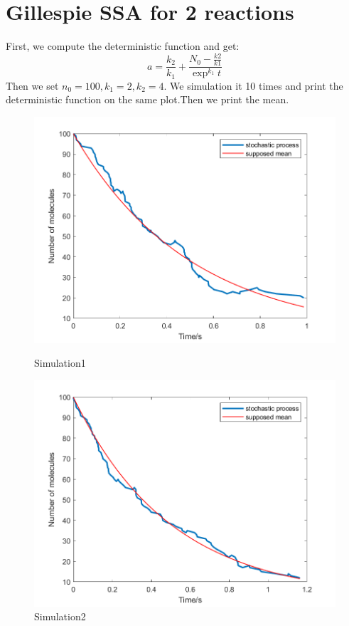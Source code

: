 \documentclass{article}
\begin{document}
\section{Gillespie SSA for 2 reactions}
First, we compute the deterministic function and get:
\begin{equation}
a=\frac{k_2}{k_1}+\frac{N_0-\frac{k2}{k1}}{\exp^{k_1}t}
\end{equation}
Then we set $n_0=100,k_1=2,k_2=4$. We simulation it 10 times and print the deterministic function on the same plot.Then we print the mean.
\begin{figure}[htbp]
    \centering
    \begin{minipage}{0.45\linewidth}
        \centering
        \includegraphics[width=\linewidth]{graph/c1.png}
        \caption{Simulation1}
        \label{c1}
    \end{minipage}
    \hfill
    \begin{minipage}{0.45\linewidth}
        \centering
        \includegraphics[width=\linewidth]{graph/c2.png}
        \caption{Simulation2}
        \label{c2}
    \end{minipage}
\end{figure}
\end{document}
